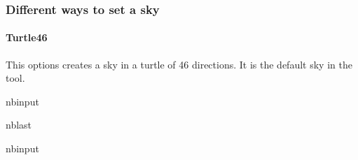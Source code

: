 \documentclass[letterpaper,10pt,english]{sphinxmanual}
\begin{document}
\subsubsection{Different ways to set a sky}
\label{\detokenize{environment_parameters:Different-ways-to-set-a-sky}}

\paragraph{Turtle46}
\label{\detokenize{environment_parameters:Turtle46}}
\sphinxAtStartPar
This options creates a sky in a turtle of 46 directions. It is the default sky in the tool.

\begin{sphinxuseclass}{nbinput}
\begin{sphinxuseclass}{nblast}
{
\begin{sphinxVerbatim}[commandchars=\\\{\}]
\llap{\color{nbsphinxin}[5]:\,\hspace{\fboxrule}\hspace{\fboxsep}}  
 
\end{sphinxVerbatim}
}

\end{sphinxuseclass}
\end{sphinxuseclass}
\begin{sphinxuseclass}{nbinput}
{
\begin{sphinxVerbatim}[commandchars=\\\{\}]
\llap{\color{nbsphinxin}[6]:\,\hspace{\fboxrule}\hspace{\fboxsep}}   
  
\end{sphinxVerbatim}
}

\end{sphinxuseclass}
\end{document}
